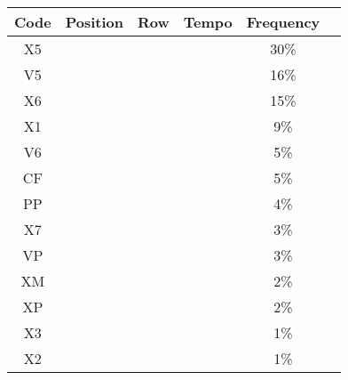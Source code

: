 \begin{tabular}{c|ccccc}
  Code  & Position  & Row & Tempo & Frequency\\
  \hline
  X5    &           &     &       & 30\%\\
  V5    &           &     &       & 16\%\\
  X6    &           &     &       & 15\%\\
  X1    &           &     &       & 9\%\\
  V6    &           &     &       & 5\%\\
  CF    &           &     &       & 5\%\\
  PP    &           &     &       & 4\%\\
  X7    &           &     &       & 3\%\\
  VP    &           &     &       & 3\%\\
  XM    &           &     &       & 2\%\\
  XP    &           &     &       & 2\%\\
  X3    &           &     &       & 1\%\\
  X2    &           &     &       & 1\%\\
\end{tabular}
